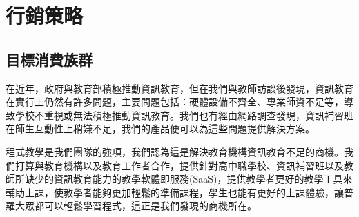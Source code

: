 \section{行銷策略}

\subsection{目標消費族群}
\par 在近年，政府與教育部積極推動資訊教育，但在我們與教師訪談後發現，資訊教育在實行上仍然有許多問題，主要問題包括：硬體設備不齊全、專業師資不足等，導致學校不重視或無法積極推動資訊教育。我們也有經由網路調查發現，資訊補習班在師生互動性上稍嫌不足，我們的產品便可以為這些問題提供解決方案。
\par 程式教學是我們團隊的強項，我們認為這是解決教育機構資訊教育不足的商機。我們打算與教育機構以及教育工作者合作，提供針對高中職學校、資訊補習班以及教師所缺少的資訊教育能力的教學軟體即服務(SaaS)，提供教學者更好的教學工具來輔助上課，使教學者能夠更加輕鬆的準備課程，學生也能有更好的上課體驗，讓普羅大眾都可以輕鬆學習程式，這正是我們發現的商機所在。